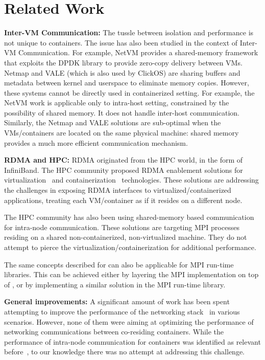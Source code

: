 \section{Related Work} \label{sec:related}


\textbf{Inter-VM Communication:} The tussle between isolation and performance is
not unique to containers.  The issue has also been studied in the context of
Inter-VM Communication.  For example, NetVM\cite{netvm} provides a shared-memory
framework that exploits the DPDK library to provide zero-copy delivery between
VMs.  Netmap\cite{netmap} and VALE\cite{vale} (which is also used by
ClickOS\cite{clickos}) are sharing buffers and metadata between kernel and
userspace to eliminate memory copies.  However, these systems cannot be directly
used in containerized setting.  For example, the NetVM work is applicable only
to intra-host setting, constrained by the possibility of shared memory. It does
not handle inter-host communication.  Similarly, the Netmap and VALE solutions
are sub-optimal when the VMs/containers are located on the same physical
machine: shared memory provides a much more efficient communication mechanism.

\textbf{RDMA and HPC:} RDMA originated from the HPC world, in the form of
InfiniBand. The HPC community proposed RDMA enablement solutions for
virtualization~\cite{ranadive2012toward} and
containerization~\cite{rdmacontainers} technologies. These solutions are
addressing the challenges in exposing RDMA interfaces to
virtualized/containerized applications, treating each VM/container as if it
resides on a different node.

The HPC community has also been using shared-memory based
communication~\cite{KNEM,MPI:p:MPI,HybridMPI} for intra-node communication.
These solutions are targeting MPI processes residing on a shared
non-containerized, non-virtualized machine. They do not attempt to pierce the
virtualization/containerization for additional performance.

The same concepts described for \sysname can also be applicable for MPI run-time
libraries. This can be achieved either by layering the MPI implementation on top
of \sysname, or by implementing a similar solution in the MPI run-time library.

\textbf{General improvements:} A significant amount of work has been spent
attempting to improve the performance of the networking
stack~\cite{lls,rfc7609,XenLoop} in various scenarios. However, none of them
were aiming at optimizing the performance of networking communications between
co-residing containers. While the performance of intra-node communication for
containers was identified as relevant
before~\cite{container-networking-modules}, to our knowledge there was no
attempt at addressing this challenge.


